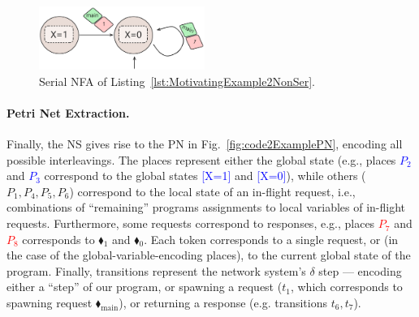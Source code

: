 \begin{figure}  %
	\centering
	\includegraphics[width=0.48\textwidth,trim=0 0 0 0,clip]{plots/code_2_NFA_v3.pdf}
	\caption{Serial NFA of Listing~\ref{lst:MotivatingExample2NonSer}.}
	\label{fig:code2ExampleNFA}
\end{figure}




\paragraph{Petri Net Extraction.}

Finally, the NS gives rise to the PN in Fig.~\ref{fig:code2ExamplePN}, encoding all possible interleavings.
%
The places represent either the global state
(e.g., places \textcolor{blue}{$P_2$} and \textcolor{blue}{$P_3$} correspond to the global states \textcolor{blue}{[X=1]} and \textcolor{blue}{[X=0]}), while others ($P_1,P_4,P_5,P_6$) correspond to the local state of an in-flight request, i.e., combinations of ``remaining'' programs  assignments to local variables of in-flight requests.
%
Furthermore, some requests correspond to responses, e.g., places \textcolor{red}{$P_7$} and \textcolor{red}{$P_8$} corresponds to {\color{red}$\blacklozenge_1$} and {\color{red}$\blacklozenge_0$}.
%
Each token corresponds to a single request, or (in the case of the global-variable-encoding places), to the current global state of the program.
%
Finally, transitions represent the network system's $\delta$ step --- encoding either a ``step'' of our program, or spawning a request ($t_1$, which  corresponds to spawning request {\color{ForestGreen}$\blacklozenge_\text{main}$}), or returning a response (e.g. transitions $t_6,t_7$).
%


